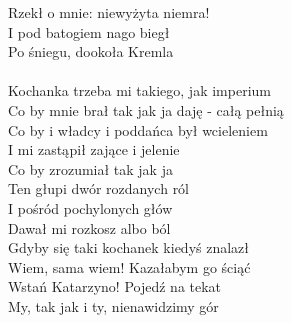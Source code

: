 \documentclass[a5paper, 10pt]{book}
\begin{document}
\begin{minipage}[t]{0.85\textwidth}
Rzekł o mnie: niewyżyta niemra!\\
I pod batogiem nago biegł\\
Po śniegu, dookoła Kremla\\
\\
Kochanka trzeba mi takiego, jak imperium\\
Co by mnie brał tak jak ja daję - całą pełnią\\
Co by i władcy i poddańca był wcieleniem\\
I mi zastąpił zające i jelenie\\
Co by zrozumiał tak jak ja\\
Ten głupi dwór rozdanych ról\\
I pośród pochylonych głów\\
Dawał mi rozkosz albo ból\\

\hspace*{5mm}Gdyby się taki kochanek kiedyś znalazł\\
\hspace*{5mm}Wiem, sama wiem! Kazałabym go ściąć\\

\hspace*{3mm}Wstań Katarzyno! Pojedź na tekat\\
\hspace*{3mm}My, tak jak i ty, nienawidzimy gór\\

\end{minipage}
\end{document}
